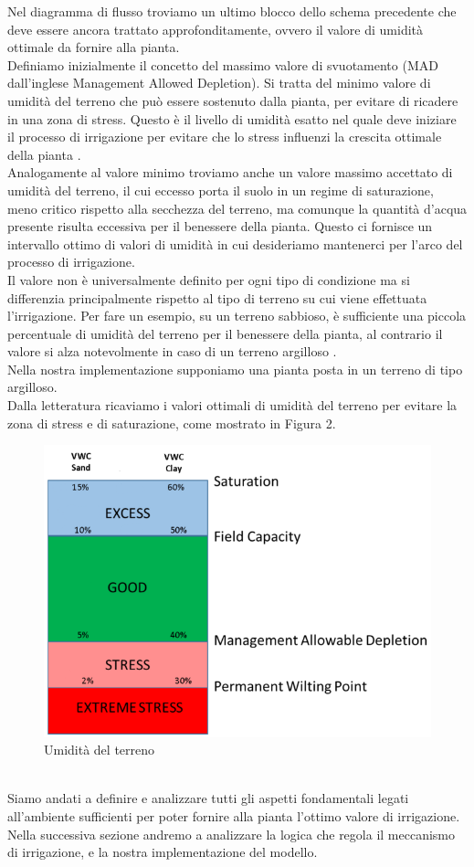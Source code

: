 \documentclass[conference,10pt]{IEEEtran}
\begin{document}
Nel diagramma di flusso troviamo un ultimo blocco dello schema precedente che deve essere ancora trattato approfonditamente, ovvero il valore di umidità ottimale da fornire alla pianta.\\
Definiamo inizialmente il concetto del massimo valore di svuotamento (MAD dall'inglese Management Allowed Depletion).
Si tratta del minimo valore di umidità del terreno che può essere sostenuto dalla pianta, per evitare di ricadere in una zona di stress.
Questo è il livello di umidità esatto nel quale deve iniziare il processo di irrigazione per evitare che lo stress influenzi la crescita ottimale della pianta \cite{5}.\\ 
Analogamente al valore minimo troviamo anche un valore massimo accettato di umidità del terreno, il cui eccesso porta il suolo in un regime di saturazione, meno critico rispetto alla secchezza del terreno, ma comunque la quantità d'acqua presente risulta eccessiva per il benessere della pianta. Questo ci fornisce un intervallo ottimo di valori di umidità in cui desideriamo mantenerci per l'arco del processo di irrigazione.\\
Il valore non è universalmente definito per ogni tipo di condizione ma si differenzia principalmente rispetto al tipo di terreno su cui viene effettuata l'irrigazione. Per fare un esempio, su un terreno sabbioso, è sufficiente una piccola percentuale di umidità del terreno per il benessere della pianta, al contrario il valore si alza notevolmente in caso di un terreno argilloso \cite{5}. \\
Nella nostra implementazione supponiamo una pianta posta in un terreno di tipo argilloso.\\ Dalla letteratura ricaviamo i valori ottimali di umidità del terreno per evitare la zona di stress e di saturazione, come mostrato in Figura 2.\vspace*{0.1 cm}
\begin{figure}[ht]
	\centering
	\includegraphics[width=0.8\linewidth]{images/SoilMoistureTerms.png}
	\caption{Umidità del terreno}
	\label{fig:MAD}
\end{figure}
\\Siamo andati a definire e analizzare tutti gli aspetti fondamentali legati all'ambiente sufficienti per poter fornire alla pianta l'ottimo valore di irrigazione.\\
Nella successiva sezione andremo a analizzare la logica che regola il meccanismo di irrigazione, e la nostra implementazione del modello.
\end{document}
